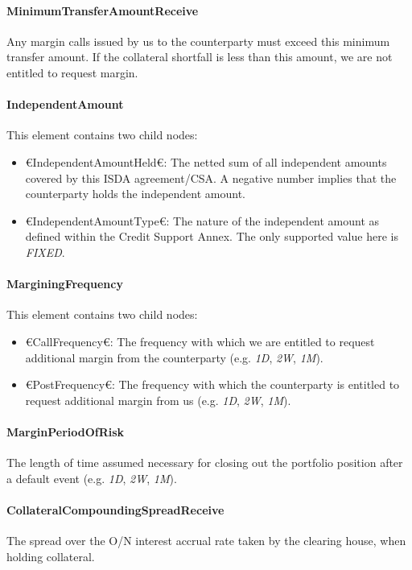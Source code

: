 \paragraph{MinimumTransferAmountReceive} Any margin calls issued by us
to the counterparty must exceed this minimum transfer amount. If the
collateral shortfall is less than this amount, we are  not
entitled to request margin.

\paragraph{IndependentAmount} This element contains two child nodes:
\begin{itemize}
\item €IndependentAmountHeld€: The netted sum of all independent amounts
  covered by this ISDA agreement/CSA. A negative number implies that
  the counterparty holds the independent amount.
\item €IndependentAmountType€: The nature of the independent amount as
  defined within the Credit Support Annex. The only supported value
  here is \emph{FIXED}. 
\end{itemize}

\paragraph{MarginingFrequency} This element contains two child nodes:
\begin{itemize}
\item €CallFrequency€: The frequency with which we are entitled to
  request additional margin from the counterparty (e.g. \emph{1D},
  \emph{2W}, \emph{1M}).
\item €PostFrequency€: The frequency with which the counterparty is entitled to
  request additional margin from us (e.g. \emph{1D},
  \emph{2W}, \emph{1M}).
\end{itemize}

\paragraph{MarginPeriodOfRisk} The length of time assumed necessary
for closing out the portfolio position after a default event  (e.g. \emph{1D},
  \emph{2W}, \emph{1M}).

\paragraph{CollateralCompoundingSpreadReceive} The spread over the O/N
interest accrual rate taken by the clearing house, when holding
collateral.

